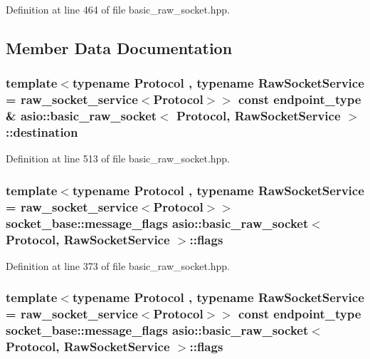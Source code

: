 Definition at line 464 of file basic\+\_\+raw\+\_\+socket.\+hpp.



\subsection{Member Data Documentation}
\hypertarget{classasio_1_1basic__raw__socket_ad4085e3f776b88e9f818fd8f34295ecb}{}
\subsubsection[{destination}]{\setlength{\rightskip}{0pt plus 5cm}template$<$typename Protocol , typename Raw\+Socket\+Service  = raw\+\_\+socket\+\_\+service$<$\+Protocol$>$$>$ const {\bf endpoint\+\_\+type} \& {\bf asio\+::basic\+\_\+raw\+\_\+socket}$<$ Protocol, Raw\+Socket\+Service $>$\+::destination}\label{classasio_1_1basic__raw__socket_ad4085e3f776b88e9f818fd8f34295ecb}


Definition at line 513 of file basic\+\_\+raw\+\_\+socket.\+hpp.

\hypertarget{classasio_1_1basic__raw__socket_a324289af06e6526b244c1074db009c3f}{}
\subsubsection[{flags}]{\setlength{\rightskip}{0pt plus 5cm}template$<$typename Protocol , typename Raw\+Socket\+Service  = raw\+\_\+socket\+\_\+service$<$\+Protocol$>$$>$ {\bf socket\+\_\+base\+::message\+\_\+flags} {\bf asio\+::basic\+\_\+raw\+\_\+socket}$<$ Protocol, Raw\+Socket\+Service $>$\+::flags}\label{classasio_1_1basic__raw__socket_a324289af06e6526b244c1074db009c3f}


Definition at line 373 of file basic\+\_\+raw\+\_\+socket.\+hpp.

\hypertarget{classasio_1_1basic__raw__socket_a44b3b4dcf3cad67bb4240f6bd2fb4a39}{}
\subsubsection[{flags}]{\setlength{\rightskip}{0pt plus 5cm}template$<$typename Protocol , typename Raw\+Socket\+Service  = raw\+\_\+socket\+\_\+service$<$\+Protocol$>$$>$ const {\bf endpoint\+\_\+type} {\bf socket\+\_\+base\+::message\+\_\+flags} {\bf asio\+::basic\+\_\+raw\+\_\+socket}$<$ Protocol, Raw\+Socket\+Service $>$\+::flags}\label{classasio_1_1basic__raw__socket_a44b3b4dcf3cad67bb4240f6bd2fb4a39}


